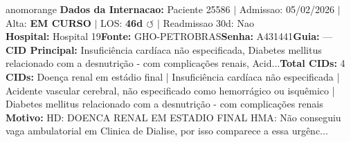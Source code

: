 \documentclass[a4paper,10pt]{article}
\begin{document}
\begin{anomalycard}[Internacao 164668 | GHO-PETROBRAS | ALTO (z=4.20)]{anomorange}
\textbf{Dados da Internacao:} Paciente 25586 $\mid$ Admissao: 05/02/2026 $\mid$ Alta: \textcolor{anomorange}{\textbf{EM CURSO}} $\mid$ LOS: \textbf{46d \textcolor{anomorange}{$\circlearrowleft$}} $\mid$ Readmissao 30d: Nao\\
\textbf{Hospital:} Hospital 19\quad\textbf{Fonte:} GHO-PETROBRAS\quad\textbf{Senha:} A431441\quad\textbf{Guia:} ---\\
\textbf{CID Principal:} {\small Insuficiência cardíaca não especificada, Diabetes mellitus relacionado com a desnutrição - com complicações renais, Acid...}\quad\textbf{Total CIDs:} 4\\

\textbf{CIDs:} {\scriptsize Doença renal em estádio final | Insuficiência cardíaca não especificada | Acidente vascular cerebral, não especificado como hemorrágico ou isquêmico | Diabetes mellitus relacionado com a desnutrição - com complicações renais}\\

\textbf{Motivo:} {\scriptsize HD: DOENCA RENAL EM ESTADIO FINAL  HMA:  Não conseguiu vaga ambulatorial em Clinica de Dialise, por isso comparece a essa urgênc...}\\


\end{anomalycard}
\end{document}
